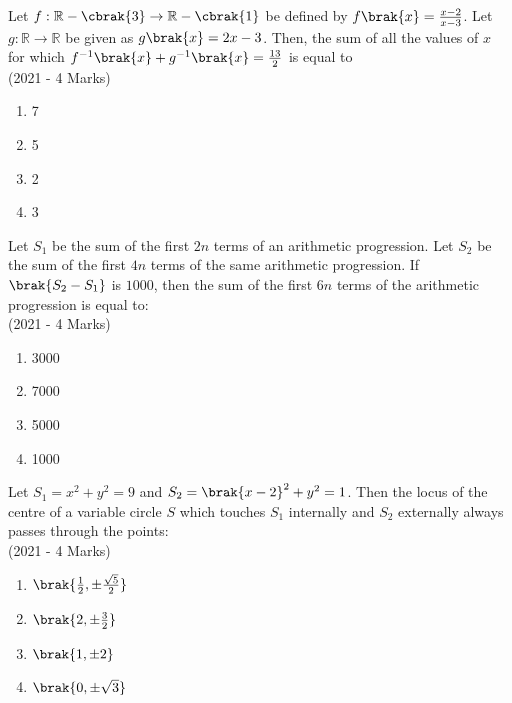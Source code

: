  	\item{
        	Let $f: \mathbb{R} - \cbrak{3} \rightarrow \mathbb{R} - \cbrak{1}$ be defined by $f\brak{x} = \frac{x - 2}{x - 3}$. Let $g: \mathbb{R} \rightarrow \mathbb{R}$ be given as $g\brak{x} = 2x - 3$. Then, the sum of all the values of $x$ for which $f^{-1}\brak{x}+ g^{-1}\brak{x} = \frac{13}{2}$ is equal to\\ \text{ }
        	\hfill
        	{(2021 - 4 Marks)}
        	
        	\begin{multicols}{4}
        		\begin{enumerate}
					\item 7
					
					\item 5
					
					\item 2
					
					\item 3
        		\end{enumerate}
        	\end{multicols}
        	
        }
 	\item{
			Let $S_1$ be the sum of the first $2n$ terms of an arithmetic progression. Let $S_2$ be the sum of the first $4n$ terms of the same arithmetic progression. If $\brak{S_2 - S_1}$ is $1000$, then the sum of the first $6n$ terms of the arithmetic progression is equal to:\\ \text{ }
			\hfill
			{(2021 - 4 Marks)}
			
			\begin{multicols}{4}
				\begin{enumerate}
					\item 3000
					\item 7000
					\item 5000
					\item 1000
				\end{enumerate}
			\end{multicols}
			
		}
 	\item{
			Let $S_1 = x^2 + y^2 = 9$ and $S_2 = \brak{x - 2}^2 + y^2 = 1$. Then the locus of the centre of a variable circle $S$ which touches $S_1$ internally and $S_2$ externally always passes through the points:\\ \text{ }
			\hfill
			{(2021 - 4 Marks)}
			
			\begin{multicols}{4}
				\begin{enumerate}
					\item $\brak{ \frac{1}{2}, \pm \frac{\sqrt{5}}{2}}$
					\item $\brak{ 2, \pm \frac{3}{2}}$
					\item $\brak{ 1, \pm 2 }$
					\item $\brak{ 0, \pm \sqrt{3}}$
				\end{enumerate}
			\end{multicols}
			
		}
